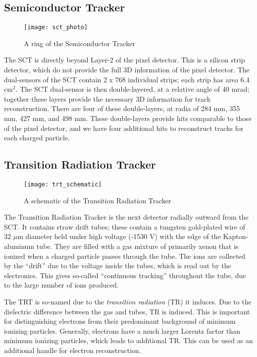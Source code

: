 \subsection{Semiconductor Tracker}
\begin{figure}
\caption{A ring of the Semiconductor Tracker} \label{fig:sct_photo}
\texttt{[image: sct\_photo]}
\end{figure}

The SCT is directly beyond Layer-2 of the pixel detector.
This is a silicon strip detector, which do not provide the full 3D information of the pixel detector.
The dual-sensors of the SCT contain 2 x 768 individual strips; each strip has area 6.4 cm$^2$.
The SCT dual-sensor is then double-layered, at a relative angle of 40 mrad; together these layers provide the necessary 3D information for track reconstruction.
There are four of these double-layers, at radia of 284 mm, 355 mm, 427 mm, and 498 mm.
These double-layers provide hits comparable to those of the pixel detector, and we have four additional hits to reconstruct tracks for each charged particle.

\subsection{Transition Radiation Tracker}
\begin{figure}
\caption{A schematic of the Transition Radiation Tracker} \label{fig:trt_schematic}
\texttt{[image: trt\_schematic]}
\end{figure}
The Transition Radiation Tracker is the next detector radially outward from the SCT.
It contains straw drift tubes; these contain a tungsten gold-plated wire of 32 $\mu$m diameter held under high voltage (-1530 V) with the edge of the Kapton-aluminum tube.
They are filled with a gas mixture of primarily xenon that is ionized when a charged particle passes through the tube.
The ions are collected by the ``drift'' due to the voltage inside the tubes, which is read out by the electronics.
This gives so-called ``continuous tracking'' throughout the tube, due to the large number of ions produced.

The TRT is so-named due to the \textit{transition radiation} (TR) it induces.
Due to the dielectric difference between the gas and tubes, TR is induced.
This is important for distinguishing electrons from their predominant background of minimum ionizing particles.
Generally, electrons have a much larger Lorentz factor than minimum ionizing particles, which leads to additional TR.
This can be used as an additional handle for electron reconstruction.

